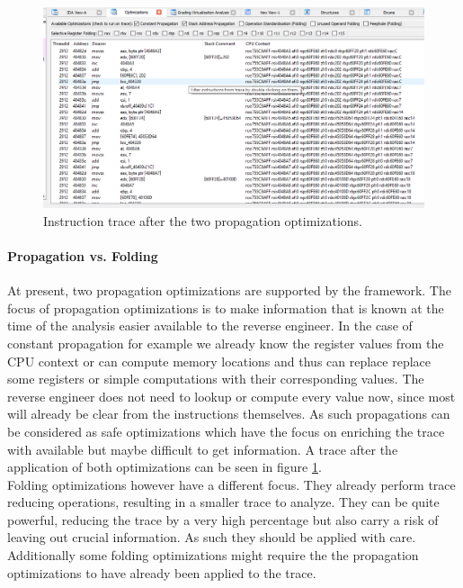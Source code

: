 \documentclass[10pt,twoside,a4paper,bibliography=totoc]{scrbook}
\begin{document}
\begin{figure}[htp]
\centering
\includegraphics[scale=0.40]{images/ch3/optimizations2.png}
\caption{Instruction trace after the two propagation optimizations.}
\label{bothprop}
\end{figure}

\paragraph*{Propagation vs. Folding}At present, two propagation optimizations are supported by the framework. The focus of propagation optimizations is to make information that is known at the time of the analysis easier available to the reverse engineer. 
In the case of constant propagation for example we already know the register values from the CPU context or can compute memory locations and thus can replace replace some registers or simple computations with their corresponding values. 
The reverse engineer does not need to lookup or compute every value now, since most will already be clear from the instructions themselves. 
As such propagations can be considered as safe optimizations which have the focus on enriching the trace with available but maybe difficult to get information.
A trace after the application of both optimizations can be seen in figure \ref{bothprop}. \\
Folding optimizations however have a different focus. They already perform trace reducing operations, resulting in a smaller trace to analyze. 
They can be quite powerful, reducing the trace by a very high percentage but also carry a risk of leaving out crucial information. As such they should be applied with care.
Additionally some folding optimizations might require the the propagation optimizations to have already been applied to the trace.
\end{document}

